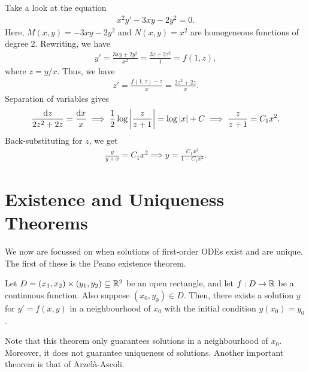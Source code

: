 \begin{example}
    Take a look at the equation
    \begin{align}
        x^{2} y' - 3xy - 2y^{2} = 0.
    \end{align}
    Here, $M(x,y) = -3xy - 2y^{2}$ and $N(x,y) = x^{2}$ are homogeneous functions of degree $2$. Rewriting, we have
    \begin{align}
        y' = \frac{3xy + 2y^{2}}{x^{2}} = \frac{3z + 2z^{2}}{1} = f(1,z),
    \end{align}
    where $z = y/x$. Thus, we have
    \begin{align}
        z' = \frac{f(1,z) - z}{x} = \frac{2z^{2} + 2z}{x}.
    \end{align}
    Separation of variables gives
    \begin{align}
        \frac{\mathrm{d}z}{2z^{2} + 2z} = \frac{\mathrm{d}x}{x} \implies \frac{1}{2} \log \left| \frac{z}{z+1} \right| = \log \left| x \right| + C \implies \frac{z}{z+1} = C_{1} x^{2}.
    \end{align}
    Back-substituting for $z$, we get
    \begin{align}
        \frac{y}{y+x} = C_{1} x^{2} \implies y = \frac{C_{1} x^{3}}{1 - C_{1} x^{2}}.
    \end{align}
\end{example}

\section{Existence and Uniqueness Theorems}

We now are focussed on when solutions of first-order ODEs exist and are unique. The first of these is the Peano existence theorem.

\begin{theorem}
    Let $D = (x_{1}, x_{2}) \times (y_{1}, y_{2}) \subseteq \mathbb{R}^{2}$ be an open rectangle, and let $f:D \to \mathbb{R}$ be a continuous function. Also suppose $(x_{0},y_{0}) \in D$. Then, there exists a solution $y$ for $y' = f(x,y)$ in a neighbourhood of $x_{0}$ with the initial condition $y(x_{0}) = y_{0}$.
\end{theorem}

Note that this theorem only guarantees solutions in a neighbourhood of $x_{0}$. Moreover, it does not guarantee uniqueness of solutions. Another important theorem is that of Arzelà-Ascoli.

